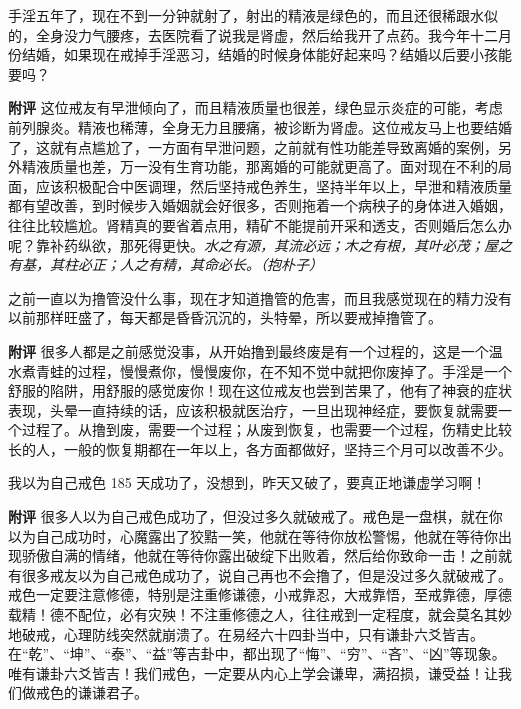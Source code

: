 \begin{case}
    手淫五年了，现在不到一分钟就射了，射出的精液是绿色的，而且还很稀跟水似的，全身没力气腰疼，去医院看了说我是肾虚，然后给我开了点药。我今年十二月份结婚，如果现在戒掉手淫恶习，结婚的时候身体能好起来吗？结婚以后要小孩能要吗？

    \textbf{附评} 这位戒友有早泄倾向了，而且精液质量也很差，绿色显示炎症的可能，考虑前列腺炎。精液也稀薄，全身无力且腰痛，被诊断为肾虚。这位戒友马上也要结婚了，这就有点尴尬了，一方面有早泄问题，之前就有性功能差导致离婚的案例，另外精液质量也差，万一没有生育功能，那离婚的可能就更高了。面对现在不利的局面，应该积极配合中医调理，然后坚持戒色养生，坚持半年以上，早泄和精液质量都有望改善，到时候步入婚姻就会好很多，否则拖着一个病秧子的身体进入婚姻，往往比较尴尬。肾精真的要省着点用，精矿不能提前开采和透支，否则婚后怎么办呢？靠补药纵欲，那死得更快。\textit{水之有源，其流必远；木之有根，其叶必茂；屋之有基，其柱必正；人之有精，其命必长。（抱朴子）}
\end{case}

\begin{case}
    之前一直以为撸管没什么事，现在才知道撸管的危害，而且我感觉现在的精力没有以前那样旺盛了，每天都是昏昏沉沉的，头特晕，所以要戒掉撸管了。

    \textbf{附评} 很多人都是之前感觉没事，从开始撸到最终废是有一个过程的，这是一个温水煮青蛙的过程，慢慢煮你，慢慢废你，在不知不觉中就把你废掉了。手淫是一个舒服的陷阱，用舒服的感觉废你！现在这位戒友也尝到苦果了，他有了神衰的症状表现，头晕一直持续的话，应该积极就医治疗，一旦出现神经症，要恢复就需要一个过程了。从撸到废，需要一个过程；从废到恢复，也需要一个过程，伤精史比较长的人，一般的恢复期都在一年以上，各方面都做好，坚持三个月可以改善不少。
\end{case}

\begin{case}
    我以为自己戒色 185 天成功了，没想到，昨天又破了，要真正地谦虚学习啊！

    \textbf{附评} 很多人以为自己戒色成功了，但没过多久就破戒了。戒色是一盘棋，就在你以为自己成功时，心魔露出了狡黠一笑，他就在等待你放松警惕，他就在等待你出现骄傲自满的情绪，他就在等待你露出破绽下出败着，然后给你致命一击！之前就有很多戒友以为自己戒色成功了，说自己再也不会撸了，但是没过多久就破戒了。戒色一定要注意修德，特别是注重修谦德，小戒靠忍，大戒靠悟，至戒靠德，厚德载精！德不配位，必有灾殃！不注重修德之人，往往戒到一定程度，就会莫名其妙地破戒，心理防线突然就崩溃了。在易经六十四卦当中，只有谦卦六爻皆吉。在“乾”、“坤”、“泰”、“益”等吉卦中，都出现了“悔”、“穷”、“吝”、“凶”等现象。唯有谦卦六爻皆吉！我们戒色，一定要从内心上学会谦卑，满招损，谦受益！让我们做戒色的谦谦君子。
\end{case}

